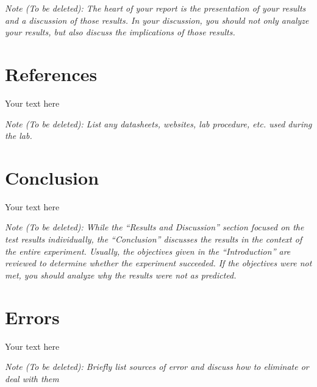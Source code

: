 \documentclass[10pt]{article}
\begin{document}
\medskip

\textit{Note (To be deleted): The heart of your report is the presentation of your results and a discussion of those results. In your discussion, you should not only analyze your results, but also discuss the implications of those results.}

\section{References}

Your text here

\medskip

\textit{Note (To be deleted): List any datasheets, websites, lab procedure, etc. used during the lab.}

\section{Conclusion}

Your text here

\medskip

\textit{Note (To be deleted): While the ``Results and Discussion'' section focused on the test results individually, the ``Conclusion'' discusses the results in the context of the entire experiment. Usually, the objectives given in the ``Introduction'' are reviewed to determine whether the experiment succeeded. If the objectives were not met, you should analyze why the results were not as predicted.}

\section{Errors}

Your text here

\medskip

\textit{Note (To be deleted): Briefly list sources of error and discuss how to eliminate or deal with them}
\end{document}

